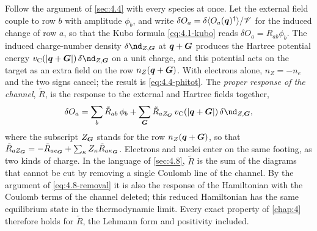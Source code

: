 Follow the argument of \cref{sec:4.4} with every species at once. Let the external field couple to row $b$ with amplitude $\phi_b$, and write $\delta O_a = \delta\langle O_a(\bm{q})^\dagger\rangle/\mathscr{V}$ for the induced change of row $a$, so that the Kubo formula \cref{eq:4.1-kubo} reads $\delta O_a = R_{ab}\phi_b$. The induced charge-number density $\delta\nd_{Z,\vect{G}}$ at $\bm{q} + \bm{G}$ produces the Hartree potential energy $v_{\mathrm{C}}(|\vect{q}+\vect{G}|)\,\delta\nd_{Z,\vect{G}}$ on a unit charge, and this potential acts on the target as an extra field on the row $n_Z(\bm{q}+\bm{G})$. With electrons alone, $n_Z = -n_e$ and the two signs cancel; the result is \cref{eq:4.4-phitot}. The \emph{proper response of the channel}, $\tilde R$, is the response to the external and Hartree fields together,
\begin{equation}
  \delta O_a = \sum_b\tilde R_{ab}\,\phi_b + \sum_{\vect{G}}\tilde R_{aZ_{\vect{G}}}\,v_{\mathrm{C}}(|\vect{q}+\vect{G}|)\,\delta\nd_{Z,\vect{G}} ,
  \label{eq:8.4-proper}
\end{equation}
where the subscript $Z_{\bm{G}}$ stands for the row $n_Z(\bm{q}+\bm{G})$, so that $\tilde R_{aZ_{\bm{G}}} = -\tilde R_{a e_{\bm{G}}} + \sum_\kappa Z_\kappa\tilde R_{a\kappa_{\bm{G}}}$. Electrons and nuclei enter on the same footing, as two kinds of charge. In the language of \cref{sec:4.8}, $\tilde R$ is the sum of the diagrams that cannot be cut by removing a single Coulomb line of the channel. By the argument of \cref{eq:4.8-removal} it is also the response of the Hamiltonian with the Coulomb terms of the channel deleted; this reduced Hamiltonian has the same equilibrium state in the thermodynamic limit. Every exact property of \cref{chap:4} therefore holds for $\tilde R$, the Lehmann form and positivity included.

